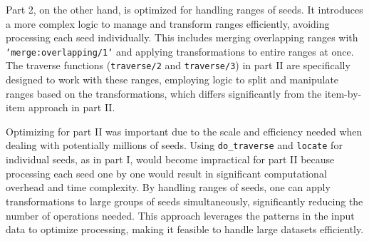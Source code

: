 \documentclass[a4paper,11pt]{article}
\begin{document}
Part 2, on the other hand, is optimized for handling ranges of seeds.
It introduces a more complex logic to manage and transform ranges efficiently,
avoiding processing each seed individually.
This includes merging overlapping ranges with
\texttt{`merge:overlapping/1`} and applying transformations to entire ranges at once.
The traverse functions
(\texttt{traverse/2} and
\texttt{traverse/3})
in part II are specifically designed to work with these ranges,
employing logic to split and manipulate ranges based on the transformations,
which differs significantly from the item-by-item approach in part II.

Optimizing for part II was important due to the scale and efficiency needed when dealing with potentially millions of seeds.
Using
\texttt{do_traverse} and
\texttt{locate}
for individual seeds, as in part I, would become impractical for part II because
processing each seed one by one would result in significant computational overhead and time complexity.
By handling ranges of seeds, one can apply transformations to large groups of seeds simultaneously,
significantly reducing the number of operations needed.
This approach leverages the patterns in the input data to optimize processing,
making it feasible to handle large datasets efficiently.
\end{document}
